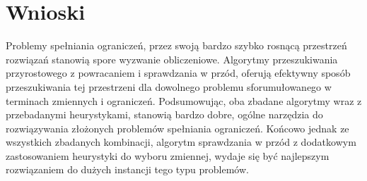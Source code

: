 \documentclass{article}
\begin{document}
\section{Wnioski}
Problemy spełniania ograniczeń, przez swoją bardzo szybko rosnącą przestrzeń rozwiązań stanowią spore wyzwanie obliczeniowe. Algorytmy przeszukiwania przyrostowego z powracaniem i sprawdzania w przód, oferują efektywny sposób przeszukiwania tej przestrzeni dla dowolnego problemu sforumułowanego w terminach zmiennych i ograniczeń. Podsumowując, oba zbadane algorytmy wraz z przebadanymi heurystykami, stanowią bardzo dobre, ogólne narzędzia do rozwiązywania złożonych problemów spełniania ograniczeń. Końcowo jednak ze wszystkich zbadanych kombinacji, algorytm sprawdzania w przód z dodatkowym zastosowaniem heurystyki do wyboru zmiennej, wydaje się być najlepszym rozwiązaniem do dużych instancji tego typu problemów. 
\end{document}

